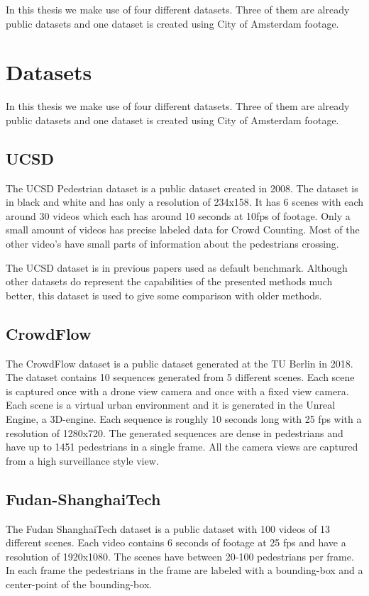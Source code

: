 In this thesis we make use of four different datasets. Three of them are already public datasets and one dataset is created using City of Amsterdam footage.

\section{Datasets}
In this thesis we make use of four different datasets. Three of them are already public datasets and one dataset is created using City of Amsterdam footage.

\subsection{UCSD}
The UCSD Pedestrian dataset \cite{Chan2008} is a public dataset created in 2008. The dataset is in black and white and has only a resolution of 234x158. It has 6 scenes with each around 30 videos which each has around 10 seconds at 10fps of footage. Only a small amount of videos has precise labeled data for Crowd Counting. Most of the other video's have small parts of information about the pedestrians crossing.

The UCSD dataset is in previous papers used as default benchmark. Although other datasets do represent the capabilities of the presented methods much better, this dataset is used to give some comparison with older methods.

\subsection{CrowdFlow}
The CrowdFlow dataset \cite{Schroder2019} is a public dataset generated at the TU Berlin in 2018. The dataset contains 10 sequences generated from 5 different scenes. Each scene is captured once with a drone view camera and once with a fixed view camera. Each scene is a virtual urban environment and it is generated in the Unreal Engine, a 3D-engine. Each sequence is roughly 10 seconds long with 25 fps with a resolution of 1280x720. The generated sequences are dense in pedestrians and have up to 1451 pedestrians in a single frame. All the camera views are captured from a high surveillance style view.

\subsection{Fudan-ShanghaiTech}
The Fudan ShanghaiTech dataset \cite{Fang2019} is a public dataset with 100 videos of 13 different scenes. Each video contains 6 seconds of footage at 25 fps and have a resolution of 1920x1080. The scenes have between 20-100 pedestrians per frame. In each frame the pedestrians in the frame are labeled with a bounding-box and a center-point of the bounding-box.

